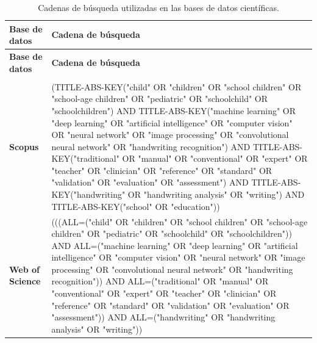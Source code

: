 \documentclass{iaesarticle}
\begin{document}
\begin{longtable}{%
    |>{\raggedright\arraybackslash}p{}%
    |>{\raggedright\arraybackslash}p{}|}
\caption{Cadenas de búsqueda utilizadas en las bases de datos científicas.}
\label{tab:cadenas-busqueda}\\
\hline
\rowcolor{blue!10}
\textbf{Base de datos} & \textbf{Cadena de búsqueda} \\ 
\hline
\endfirsthead

\hline
\rowcolor{blue!10}
\textbf{Base de datos} & \textbf{Cadena de búsqueda} \\ 
\hline
\endhead

\hline
\multicolumn{2}{r}{Continúa en la siguiente página} \\
\endfoot

\hline
\endlastfoot

\scriptsize

\textbf{Scopus} &
{\ttfamily
(TITLE-ABS-KEY("child" OR "children" OR "school children" OR "school-age children" OR "pediatric" OR "schoolchild" OR "schoolchildren")
\newline
AND TITLE-ABS-KEY("machine learning" OR "deep learning" OR "artificial intelligence" OR "computer vision" OR "neural network" OR "image processing" OR "convolutional neural network" OR "handwriting recognition")
\newline
AND TITLE-ABS-KEY("traditional" OR "manual" OR "conventional" OR "expert" OR "teacher" OR "clinician" OR "reference" OR "standard" OR "validation" OR "evaluation" OR "assessment")
\newline
AND TITLE-ABS-KEY("handwriting" OR "handwriting analysis" OR "writing")
\newline
AND TITLE-ABS-KEY("school" OR "education"))
}
\\
\hline

\textbf{Web of Science} &
{\ttfamily
(((ALL=("child" OR "children" OR "school children" OR "school-age children" OR "pediatric" OR "schoolchild" OR "schoolchildren"))
\newline
AND ALL=("machine learning" OR "deep learning" OR "artificial intelligence" OR "computer vision" OR "neural network" OR "image processing" OR "convolutional neural network" OR "handwriting recognition"))
\newline
AND ALL=("traditional" OR "manual" OR "conventional" OR "expert" OR "teacher" OR "clinician" OR "reference" OR "standard" OR "validation" OR "evaluation" OR "assessment"))
\newline
AND ALL=("handwriting" OR "handwriting analysis" OR "writing"))
}
\\
\hline


\end{longtable}
\end{document}
